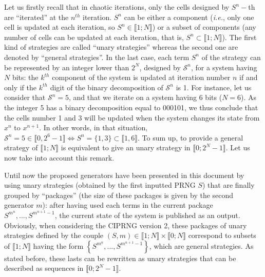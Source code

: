 Let us firstly recall that in chaotic iterations, only the cells designed by $S^{n}-$th are ``iterated'' 
at the $n^{th}$ iteration.
$S^n$ can be either a component (\emph{i.e.}, only one cell is updated at each iteration, 
so $S^n \in \llbracket 1;N \rrbracket$) or a subset of components (any number of cells can be 
updated at each iteration, that is, $S^n \subset \llbracket 1;N \rrbracket$).
The first kind of strategies are called ``unary strategies'' whereas the second one are denoted by ``general strategies''.
In the last case, each term $S^n$ of the strategy can be represented by an integer lower than $2^N$, 
designed by $\mathcal{S}^n$, for a system having $N$ bits: the $k^{th}$ component of the system is 
updated at iteration number $n$ if and only if the $k^{th}$ digit of the binary decomposition of $\mathcal{S}^n$ is 1.
For instance, let us consider that $\mathcal{S}^n=5$, and that we iterate on a system having 6 bits ($N=6$).
As the integer 5 has a binary decomposition equal to 000101, we thus conclude that the cells number 1 and 3 
will be updated when the system changes its state from $x^{n}$ to $x^{n+1}$.
In other words, in that situation, $\mathcal{S}^n=5 \in \llbracket 0,2^6-1\rrbracket \Leftrightarrow 
S^n = \{1, 3\} \subset \llbracket 1, 6 \rrbracket$.
To sum up, to provide a general strategy of $\llbracket 1;N \rrbracket$ is equivalent to 
give an unary strategy in $\llbracket 0; 2^N-1 \rrbracket$.
Let us now take into account this remark.

Until now the proposed generators have been presented in this document by using unary 
strategies (obtained by the first inputted PRNG $S$) that are finally grouped by ``packages'' 
(the size of these packages is given by the second generator $m$): after having used each terms 
in the current package $S^{m^n},...,S^{m^{n+1}-1}$, the current state of the system is published as an output.
Obviously, when considering the CIPRNG version 2, these packages of unary strategies defined by the 
couple $(S,m)\in \llbracket 1;N \rrbracket \times \llbracket 0;N \rrbracket$ correspond to 
subsets of $\llbracket 1;N \rrbracket$ having the form $\left\{S^{m^n},...,S^{m^{n+1}-1}\right\}$, 
which are general strategies.
As stated before, these lasts can be rewritten as unary strategies that can 
be described as sequences in $\llbracket 0; 2^N-1 \rrbracket$.



